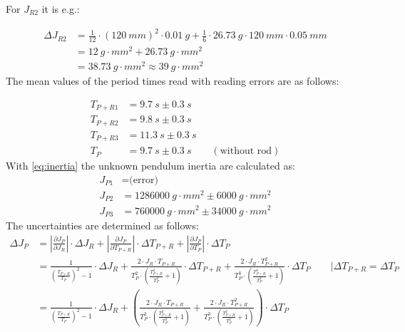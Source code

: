             For \(J_{R2}\) it is e.g.:\par
            \begin{align*}
                \Delta J_{R2}   &=\frac{1}{12}\cdot (\SI{120}{mm})^2\cdot \SI{0.01}{g} + \frac{1}{6}\cdot \SI{26.73}{g}\cdot \SI{120}{mm}\cdot \SI{0.05}{mm}\\
                                &=\SI{12}{g\cdot mm^2}+\SI{26.73}{g\cdot mm^2}\\
                                &=\SI{38.73}{g\cdot mm^2} \approx \SI{39}{g\cdot mm^2}
            \end{align*}
            The mean values of the period times read with reading errors are as follows:\par
            \begin{align}
                T_{P+R1} &=\SI{9.7}{s} \pm \SI{0.3}{s} \\
                T_{P+R2} &=\SI{9.8}{s} \pm \SI{0.3}{s} \\
                T_{P+R3} &=\SI{11.3}{s} \pm \SI{0.3}{s} \\
                T_P &=\SI{9.7}{s} \pm \SI{0.3}{s} \qquad (\text{without rod})
            \end{align}
            With \cref{eq:inertia} the unknown pendulum inertia are calculated as:
            \begin{align}
            J_{P1} &= \text{(error)} \\
            J_{P2} &= \SI{1286000}{g \cdot mm^2} \pm \SI{6000}{g \cdot mm^2} \\
            J_{P3} &= \SI{760000}{g \cdot mm^2} \pm \SI{34000}{g \cdot mm^2}
            \end{align}
            The uncertainties are determined as follows:
            \begin{align}
            \Delta J_P &= \left| \frac{\partial J_P}{\partial J_R} \right| \cdot \Delta J_R + \left| \frac{\partial J_P}{\partial T_{P+R}} \right| \cdot \Delta T_{P+R} + \left| \frac{\partial J_P}{\partial T_P} \right| \cdot \Delta T_P \nonumber \\
            &= \frac{1}{\left( \frac{T_{P+R}}{T_P} \right)^2-1} \cdot \Delta J_R + \frac{2 \cdot J_R \cdot T_{P+R}}{T_P^2 \cdot \left( \frac{T_{P+R}^2}{T_P^2}+1 \right)} \cdot \Delta T_{P+R} + \frac{2 \cdot J_R \cdot T_{P+R}^2}{T_P^3 \cdot \left( \frac{T_{P+R}^2}{T_P^2}+1 \right)} \cdot \Delta T_P \qquad \Big| \Delta T_{P+R} = \Delta T_P \nonumber \\
            &= \frac{1}{\left( \frac{T_{P+R}}{T_P} \right)^2-1} \cdot \Delta J_R + \left( \frac{2 \cdot J_R \cdot T_{P+R}}{T_P^2 \cdot \left( \frac{T_{P+R}^2}{T_P^2}+1 \right)} + \frac{2 \cdot J_R \cdot T_{P+R}^2}{T_P^3 \cdot \left( \frac{T_{P+R}^2}{T_P^2}+1 \right)} \right) \cdot \Delta T_P
            \end{align}
